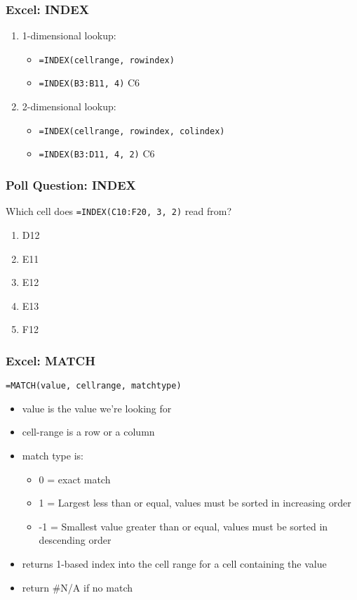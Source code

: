 \documentclass{beamer}
\begin{document}
%
%
\begin{frame}[fragile]
  \frametitle{Excel: INDEX}
  \begin{enumerate}
    \item 1-dimensional lookup:
      \begin{itemize}
        \item \lstinline|=INDEX(cellrange, rowindex)|
        \item \lstinline|=INDEX(B3:B11, 4)| \textrightarrow C6
      \end{itemize}
    \item 2-dimensional lookup:
      \begin{itemize}
        \item \lstinline|=INDEX(cellrange, rowindex, colindex)|
        \item \lstinline|=INDEX(B3:D11, 4, 2)| \textrightarrow C6
      \end{itemize}
  \end{enumerate}
\end{frame}


%
%
\begin{frame}[fragile]
  \frametitle{Poll Question: INDEX}
  Which cell does \lstinline|=INDEX(C10:F20, 3, 2)| read from?
  \vfill
  \begin{enumerate}[A]
    \item D12
    \item E11
    \item E12
    \item E13
    \item F12
  \end{enumerate}
\end{frame}


%
%
\begin{frame}[fragile]
  \frametitle{Excel: MATCH}
  \lstinline|=MATCH(value, cellrange, matchtype)|
  \begin{itemize}
    \item value is the value we're looking for
    \item cell-range is a row or a column 
    \item match type is:
      \begin{itemize}
        \item 0 = exact match
        \item 1 = Largest less than or equal, values must be sorted in increasing order
        \item -1 = Smallest value greater than or equal, values must be sorted in descending order
      \end{itemize}
    \item returns 1-based index into the cell range for a cell containing the value
    \item return \#N/A if no match
  \end{itemize}
\end{frame}
\end{document}
